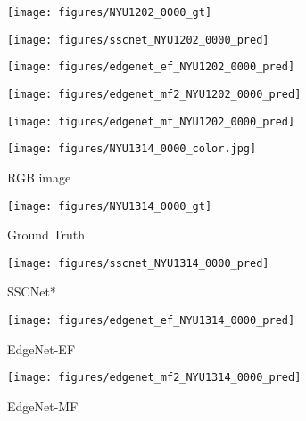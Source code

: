 \begin{figure*}[ht]
\begin{subfigure}{0.16\textwidth}
\end{subfigure}
\begin{subfigure}{0.16\textwidth}
\texttt{[image: figures/NYU1202\_0000\_gt]}
\end{subfigure}
\begin{subfigure}{0.16\textwidth}
\texttt{[image: figures/sscnet\_NYU1202\_0000\_pred]}

\end{subfigure}
\begin{subfigure}{0.16\textwidth}
\texttt{[image: figures/edgenet\_ef\_NYU1202\_0000\_pred]}

\end{subfigure}
\begin{subfigure}{0.16\textwidth}
\texttt{[image: figures/edgenet\_mf2\_NYU1202\_0000\_pred]}

\end{subfigure}
\begin{subfigure}{0.16\textwidth}
\texttt{[image: figures/edgenet\_mf\_NYU1202\_0000\_pred]}

\end{subfigure}



\begin{subfigure}{0.16\textwidth}
\texttt{[image: figures/NYU1314\_0000\_color.jpg]}
\caption{RGB image}

\end{subfigure}
\begin{subfigure}{0.16\textwidth}
\texttt{[image: figures/NYU1314\_0000\_gt]}
\caption{Ground Truth}
\end{subfigure}
\begin{subfigure}{0.16\textwidth}
\texttt{[image: figures/sscnet\_NYU1314\_0000\_pred]}
\caption{SSCNet*}

\end{subfigure}
\begin{subfigure}{0.16\textwidth}
\texttt{[image: figures/edgenet\_ef\_NYU1314\_0000\_pred]}
\caption{EdgeNet-EF}

\end{subfigure}
\begin{subfigure}{0.16\textwidth}
\texttt{[image: figures/edgenet\_mf2\_NYU1314\_0000\_pred]}
\caption{EdgeNet-MF}


\end{subfigure}
\end{figure*}
